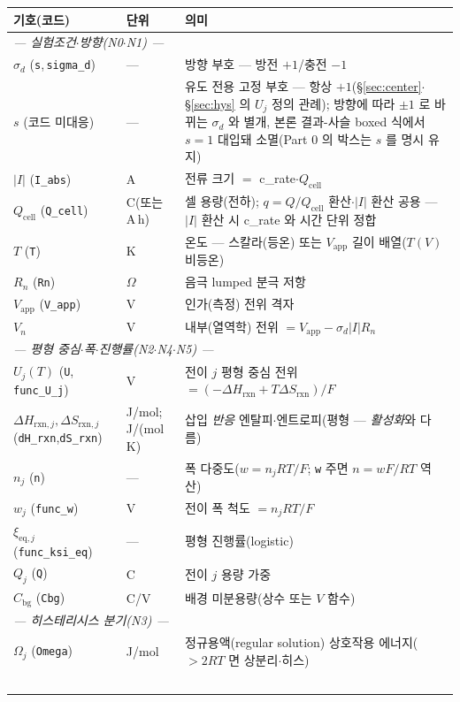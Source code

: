 \documentclass[11pt,a4paper]{article}
\newcommand{\eq}{\mathrm{eq}}
\newcommand{\app}{\mathrm{app}}
\newcommand{\cell}{\mathrm{cell}}
\newcommand{\bg}{\mathrm{bg}}
\newcommand{\rxn}{\mathrm{rxn}}
\newcommand{\code}[1]{\texttt{#1}}
\begin{document}
\begin{longtable}{p{} p{} p{}}
\toprule 기호(코드) & 단위 & 의미 \\ \midrule \endhead
\multicolumn{3}{l}{\emph{— 실험조건$\cdot$방향(N0$\cdot$N1) —}}\\
$\sigma_d$ (\code{s},\,\code{sigma\_d}) & --- & 방향 부호 — 방전 $+1$/충전 $-1$ \\
$s$ (코드 미대응) & --- & 유도 전용 고정 부호 — 항상 $+1$(\S\ref{sec:center}$\cdot$\S\ref{sec:hys} 의 $U_j$ 정의 관례); 방향에 따라 $\pm1$ 로 바뀌는 $\sigma_d$ 와 별개, 본론 결과-사슬 boxed 식에서 $s{=}1$ 대입돼 소멸(Part 0 의 박스는 $s$ 를 명시 유지) \\
$|I|$ (\code{I\_abs}) & A & 전류 크기 $=$ c\_rate$\cdot Q_\cell$ \\
$Q_\cell$ (\code{Q\_cell}) & C(또는 A\,h) & 셀 용량(전하); $q=Q/Q_\cell$ 환산$\cdot$$|I|$ 환산 공용 — $|I|$ 환산 시 c\_rate 와 시간 단위 정합 \\
$T$ (\code{T}) & K & 온도 — 스칼라(등온) 또는 $V_\app$ 길이 배열($T(V)$ 비등온) \\
$R_n$ (\code{Rn}) & $\Omega$ & 음극 lumped 분극 저항 \\
$V_\app$ (\code{V\_app}) & V & 인가(측정) 전위 격자 \\
$V_n$ & V & 내부(열역학) 전위 $=V_\app-\sigma_d|I|R_n$ \\
\multicolumn{3}{l}{\emph{— 평형 중심$\cdot$폭$\cdot$진행률(N2$\cdot$N4$\cdot$N5) —}}\\
$U_j(T)$ (\code{U},\,\code{func\_U\_j}) & V & 전이 $j$ 평형 중심 전위 $=(-\Delta H_\rxn+T\Delta S_\rxn)/F$ \\
$\Delta H_{\rxn,j},\Delta S_{\rxn,j}$ (\code{dH\_rxn},\code{dS\_rxn}) & {\footnotesize J/mol;\,J/(mol\,K)} & 삽입 \emph{반응} 엔탈피$\cdot$엔트로피(평형 — \emph{활성화}와 다름) \\
$n_j$ (\code{n}) & --- & 폭 다중도($w=n_jRT/F$; \code{w} 주면 $n=wF/RT$ 역산) \\
$w_j$ (\code{func\_w}) & V & 전이 폭 척도 $=n_jRT/F$ \\
$\xi_{\eq,j}$ (\code{func\_ksi\_eq}) & --- & 평형 진행률(logistic) \\
$Q_j$ (\code{Q}) & C & 전이 $j$ 용량 가중 \\
$C_\bg$ (\code{Cbg}) & C/V & 배경 미분용량(상수 또는 $V$ 함수) \\
\multicolumn{3}{l}{\emph{— 히스테리시스 분기(N3) —}}\\
$\Omega_j$ (\code{Omega}) & J/mol & 정규용액(regular solution) 상호작용 에너지($>2RT$ 면 상분리$\cdot$히스) \\
$$
\end{longtable}
\end{document}
